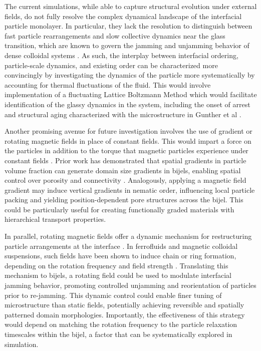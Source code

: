 The current simulations, while able to capture structural evolution under external fields, do not fully resolve the complex dynamical 
landscape of the interfacial particle monolayer. In particular, they lack the resolution to distinguish between fast particle rearrangements 
and slow collective dynamics near the glass transition, which are known to govern the jamming and unjamming behavior of dense 
colloidal systems \cite{weeks_introduction_2017, torquato_jammed_2010}. 
As such, the interplay between interfacial ordering, particle-scale dynamics, and existing order can be characterized more convincingly by 
investigating the dynamics of the particle more systematically by accounting for thermal fluctuations of the fluid. This would involve 
implementation of a fluctuating Lattice Boltzmann Method which would facilitate identification of the glassy dynamics in the system, 
including the onset of arrest and structural aging characterized with the microstructure in Gunther et al \cite{gunther_timescales_2014}.

Another promising avenue for future investigation involves the use of gradient or rotating magnetic fields in place of constant fields. This
would impart a force on the particles in addition to the torque that magnetic particles experience under 
constant fields \cite{spatafora-salazar_hierarchical_2021, martinezpedrero_collective_2020}.
Prior work has demonstrated that spatial gradients in particle volume fraction can generate domain size gradients in bijels, enabling spatial 
control over porosity and connectivity \cite{french_bicontinuous_2022}. Analogously, applying a magnetic field gradient may induce vertical 
gradients in nematic order, influencing local particle packing and yielding position-dependent pore structures across the bijel. This could be 
particularly useful for creating functionally graded materials with hierarchical transport properties.

In parallel, rotating magnetic fields offer a dynamic mechanism for restructuring particle arrangements 
at the interface \cite{spatafora-salazar_hierarchical_2021, martinezpedrero_collective_2020}. 
In ferrofluids and magnetic colloidal suspensions, such fields have been shown to induce chain or ring formation, depending on the rotation frequency and field 
strength \cite{spatafora-salazar_hierarchical_2021, martinezpedrero_collective_2020}. 
Translating this mechanism to bijels, a rotating field could be used to modulate interfacial jamming behavior, promoting controlled 
unjamming and reorientation of particles prior to re-jamming. This dynamic control could enable finer tuning of microstructure than static fields, 
potentially achieving reversible and spatially patterned domain morphologies. Importantly, the effectiveness of this strategy would depend on 
matching the rotation frequency to the particle relaxation timescales within the bijel, a factor that can be systematically explored in simulation.


